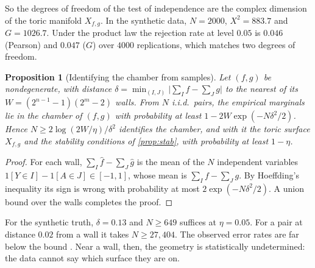 \documentclass[11pt]{article}
\newtheorem{proposition}[theorem]{Proposition}
\theoremstyle{definition}
\theoremstyle{remark}
\begin{document}
So the degrees of freedom of the test of independence are the complex dimension of the toric manifold $X_{f,g}$. In the
synthetic data, $N=2000$, $X^2=883.7$ and $G=1026.7$. Under the product law the rejection rate at level $0.05$ is $0.046$
(Pearson) and $0.047$ ($G$) over $4000$ replications, which matches two degrees of freedom.

\begin{proposition}[Identifying the chamber from samples]\label{prop:chamberid}
Let $(f,g)$ be nondegenerate, with distance $\delta=\min_{(I,J)}\lvert\sum_If-\sum_Jg\rvert$ to the nearest of its
$W=(2^{n-1}-1)(2^m-2)$ walls. From $N$ i.i.d.\ pairs, the empirical marginals lie in the chamber of $(f,g)$ with probability
at least $1-2W\exp(-N\delta^2/2)$. Hence $N\ge2\log(2W/\eta)/\delta^2$ identifies the chamber, and with it the toric
surface $X_{f,g}$ and the stability conditions of \cref{prop:stab}, with probability at least $1-\eta$.
\end{proposition}
\begin{proof}
For each wall, $\sum_I\hat f-\sum_J\hat g$ is the mean of the $N$ independent variables $1[Y\in I]-1[A\in J]\in[-1,1]$, whose
mean is $\sum_If-\sum_Jg$. By Hoeffding's inequality its sign is wrong with probability at most $2\exp(-N\delta^2/2)$. A union
bound over the walls completes the proof.
\end{proof}

For the synthetic truth, $\delta=0.13$ and $N\ge649$ suffices at $\eta=0.05$. For a pair at distance $0.02$ from a wall it
takes $N\ge27{,}404$. The observed error rates are far below the bound \cite[\S15]{Awasthi-Family}. Near a wall, then, the
geometry is statistically undetermined: the data cannot say which surface they are on.
\end{document}

